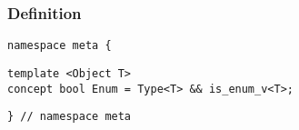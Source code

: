 
\subsubsection{Definition}

\begin{verbatim}
namespace meta {
\end{verbatim}
\begin{verbatim}
template <Object T>
concept bool Enum = Type<T> && is_enum_v<T>;

\end{verbatim}
\begin{verbatim}
} // namespace meta
\end{verbatim}
